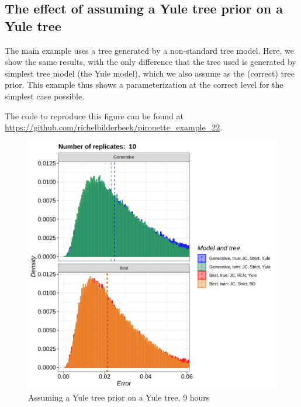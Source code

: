 \subsection{The effect of assuming a Yule tree prior on a Yule tree}
\label{subsec:simplest_correct_parameterization}

The main example uses a tree generated by a non-standard tree model.
Here, we show the same results, with the only difference that
the tree used is generated by simplest tree model (the Yule model),
which we also assume as the (correct) tree prior.
This example thus shows a parameterization at the correct level for the
simplest case possible.

The code to reproduce this figure can be found at  
\url{https://github.com/richelbilderbeek/pirouette_example_22}.

\begin{figure}[H]
  \includegraphics[width=\textwidth]{pirouette_example_22/errors.png}
  \caption{Assuming a Yule tree prior on a Yule tree, 9 hours}
\end{figure}

